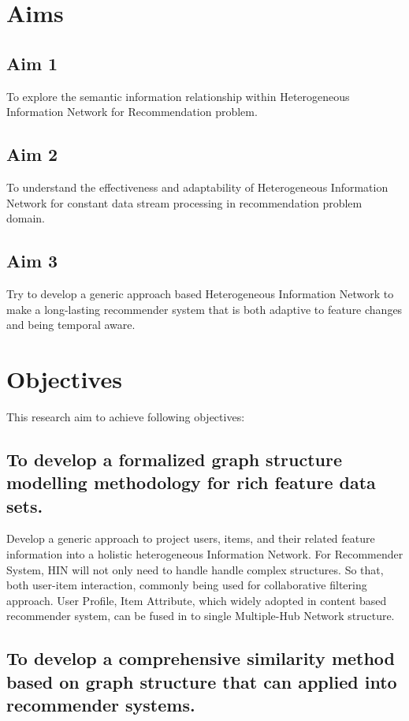 \documentclass[12pt,a4 paper,title page]{article}
\theoremstyle{definition}
\begin{document}
\section{Aims}
\subsection{Aim 1}
To explore the semantic information relationship within Heterogeneous Information Network for Recommendation problem.

\subsection{Aim 2}
To understand the effectiveness and adaptability of Heterogeneous Information Network for constant data stream processing in recommendation problem domain. 

\subsection{Aim 3}
Try to develop a generic approach based Heterogeneous Information Network to make a long-lasting recommender system that is both adaptive to feature changes and being temporal aware. 

\section{Objectives}
This research aim to achieve following objectives: 

\subsection{To develop a formalized graph structure modelling methodology for rich feature data sets.  }

Develop a generic approach to project users, items, and their related feature information into a holistic heterogeneous Information Network. For Recommender System, HIN will not only need to handle handle complex structures. So that, both user-item interaction, commonly being used for collaborative filtering approach. User Profile, Item Attribute, which widely adopted in content based recommender system, can be fused in to single Multiple-Hub Network \citep{Shi2017} structure.

\subsection{To develop a comprehensive similarity method based on graph structure that can applied into recommender systems. } 
\end{document}
